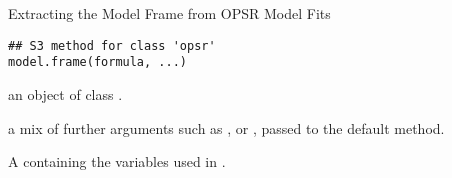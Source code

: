 
%
\begin{Description}
Extracting the Model Frame from OPSR Model Fits
\end{Description}
%
\begin{Usage}
\begin{verbatim}
## S3 method for class 'opsr'
model.frame(formula, ...)
\end{verbatim}
\end{Usage}
%
\begin{Arguments}
\begin{ldescription}
\item[\code{formula}] an object of class .

\item[\code{...}] a mix of further arguments such as ,  or ,
passed to the default method.
\end{ldescription}
\end{Arguments}
%
\begin{Value}
A  containing the variables used in .
\end{Value}
%
\begin{SeeAlso}
\end{SeeAlso}


